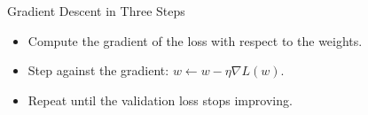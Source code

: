 \documentclass{beamer}
\begin{document}
\begin{frame}{Gradient Descent in Three Steps}
\begin{itemize}
\item Compute the gradient of the loss with respect to the weights.
\item Step against the gradient: $w \leftarrow w - \eta \nabla L(w)$.
\item Repeat until the validation loss stops improving.
\end{itemize}
\end{frame}
\end{document}
